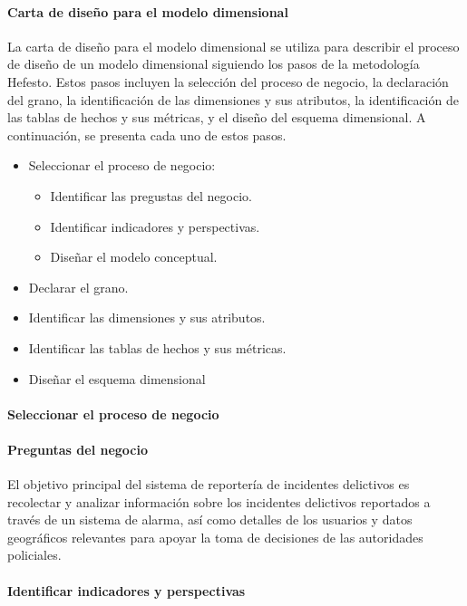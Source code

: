 \paragraph{Carta de diseño para el modelo dimensional}

La carta de diseño para el modelo dimensional se utiliza para describir el proceso de diseño de un modelo dimensional
siguiendo los pasos de la metodología Hefesto. Estos pasos incluyen la selección del proceso de negocio, la declaración
del grano, la identificación de las dimensiones y sus atributos, la identificación de las tablas de hechos y sus métricas,
y el diseño del esquema dimensional. A continuación, se presenta cada uno de estos pasos.

\begin{itemize}
    \item Seleccionar el proceso de negocio:
          \begin{itemize}
              \item Identificar las pregustas del negocio.
              \item Identificar indicadores y perspectivas.
              \item Diseñar el modelo conceptual.
          \end{itemize}
    \item Declarar el grano.
    \item Identificar las dimensiones y sus atributos.
    \item Identificar las tablas de hechos y sus métricas.
    \item Diseñar el esquema dimensional
\end{itemize}

\paragraph{Seleccionar el proceso de negocio}

\paragraph{Preguntas del negocio}

El objetivo principal del sistema de reportería de incidentes delictivos es recolectar y analizar información
sobre los incidentes delictivos reportados a través de un sistema de alarma, así como detalles de los usuarios
y datos geográficos relevantes para apoyar la toma de decisiones de las autoridades policiales.

\paragraph{Identificar indicadores y perspectivas}

